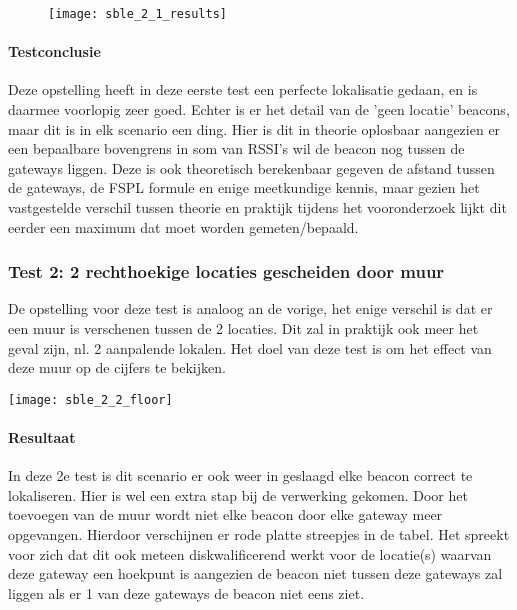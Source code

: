 \begin{figure}[h]
	\texttt{[image: sble\_2\_1\_results]}
	\label{fig:ond-ble-static-2-1-res}
\end{figure}

\paragraph{Testconclusie}
Deze opstelling heeft in deze eerste test een perfecte lokalisatie gedaan, en is daarmee voorlopig zeer goed. Echter is er het detail van de 'geen locatie' beacons, maar dit is in elk scenario een ding. Hier is dit in theorie oplosbaar aangezien er een bepaalbare bovengrens in som van RSSI's wil de beacon nog tussen de gateways liggen. Deze is ook theoretisch berekenbaar gegeven de afstand tussen de gateways, de FSPL formule en enige meetkundige kennis, maar gezien het vastgestelde verschil tussen theorie en praktijk tijdens het vooronderzoek lijkt dit eerder een maximum dat moet worden gemeten/bepaald.

\subsubsection{Test 2: 2 rechthoekige locaties gescheiden door muur}
\begin{minipage}{0.55\textwidth}
De opstelling voor deze test is analoog an de vorige, het enige verschil is dat er een muur is verschenen tussen de 2 locaties. Dit zal in praktijk ook meer het geval zijn, nl. 2 aanpalende lokalen. Het doel van deze test is om het effect van deze muur op de cijfers te bekijken.
\end{minipage}
\hfill
\begin{minipage}{0.42\textwidth}
	\texttt{[image: sble\_2\_2\_floor]}
	\label{fig:ond-ble-static-2-2-ops}
\end{minipage}

\paragraph{Resultaat}
In deze 2e test is dit scenario er ook weer in geslaagd elke beacon correct te lokaliseren. Hier is wel een extra stap bij de verwerking gekomen. Door het toevoegen van de muur wordt niet elke beacon door elke gateway meer opgevangen. Hierdoor verschijnen er rode platte streepjes in de tabel. Het spreekt voor zich dat dit ook meteen diskwalificerend werkt voor de locatie(s) waarvan deze gateway een hoekpunt is aangezien de beacon niet tussen deze gateways zal liggen als er 1 van deze gateways de beacon niet eens ziet.

